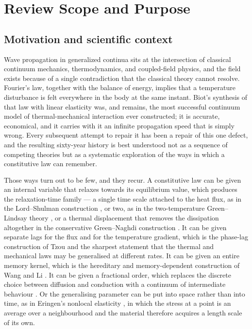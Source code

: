 \section{Review Scope and Purpose}
\label{sec:scope}

\subsection{Motivation and scientific context}

Wave propagation in generalized continua sits at the intersection of classical continuum mechanics, thermodynamics, and coupled-field physics, and the field exists because of a single contradiction that the classical theory cannot resolve. Fourier's law, together with the balance of energy, implies that a temperature disturbance is felt everywhere in the body at the same instant. Biot's synthesis of that law with linear elasticity \cite{Biot1956} was, and remains, the most successful continuum model of thermal-mechanical interaction ever constructed; it is accurate, economical, and it carries with it an infinite propagation speed that is simply wrong. Every subsequent attempt to repair it has been a repair of this one defect, and the resulting sixty-year history is best understood not as a sequence of competing theories but as a systematic exploration of the ways in which a constitutive law can remember.

Those ways turn out to be few, and they recur. A constitutive law can be given an internal variable that relaxes towards its equilibrium value, which produces the relaxation-time family --- a single time scale attached to the heat flux, as in the Lord--Shulman construction \cite{Lord1967}, or two, as in the two-temperature Green--Lindsay theory \cite{Green1972}, or a thermal displacement that removes the dissipation altogether in the conservative Green--Naghdi construction \cite{Green1991,Green1993}. It can be given separate lags for the flux and for the temperature gradient, which is the phase-lag construction of Tzou \cite{Tzou1995,Tzou1997} and the sharpest statement that the thermal and mechanical laws may be generalised at different rates. It can be given an entire memory kernel, which is the hereditary and memory-dependent construction of Wang and Li \cite{Wang2011}. It can be given a fractional order, which replaces the discrete choice between diffusion and conduction with a continuum of intermediate behaviour \cite{Caputo1967,Povstenko2004,Povstenko2016}. Or the generalising parameter can be put into space rather than into time, as in Eringen's nonlocal elasticity \cite{Eringen1972,Eringen1974,Eringen1983}, in which the stress at a point is an average over a neighbourhood and the material therefore acquires a length scale of its own.


